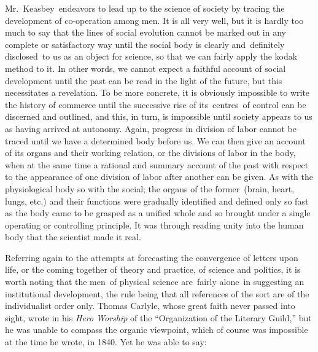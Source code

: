 \documentclass[openany,nobib]{tufte-book}
\begin{document}
Mr.~Keasbey~endeavors to lead up to the science of society by tracing
the development of co-operation among men. It is all very well, but it
is hardly too much to say that the lines of social evolution cannot be
marked out in any complete or satisfactory way until the social body is
clearly and~definitely disclosed~to us as an object for science, so that
we can fairly apply the kodak method to it. In other words, we cannot
expect a faithful account of social development until the past can be
read in the light of the future, but this necessitates a revelation. To
be more concrete, it is obviously impossible to write the history of
commerce until the successive rise of its~centres~of control can be
discerned and outlined, and this, in turn, is impossible until society
appears to us as having arrived at autonomy. Again, progress in division
of labor cannot be traced until we have a determined body before us. We
can then give an account of its organs and their working relation, or
the divisions of labor in the body, when at the same time a rational and
summary account of the past with respect to the appearance of one
division of labor after another can be given. As with the physiological
body so with the social; the organs of the former~(brain, heart, lungs,
etc.) and their functions were gradually identified and defined only so
fast as the body came to be grasped as a unified whole and so brought
under a single operating or controlling principle. It was through
reading unity into the human body that the scientist made it real.~

Referring again to the attempts at forecasting the convergence of
letters upon life, or the coming together of theory and practice, of
science and politics, it is worth noting that the men~of physical
science are~fairly alone~in suggesting an institutional development, the
rule being that all references of the sort are of the individualist
order only. Thomas Carlyle, whose great faith never passed into sight,
wrote in his \emph{Hero Worship} of the ``Organization of the Literary
Guild,'' but he was unable to compass the organic viewpoint, which of
course was impossible at the time he wrote, in 1840. Yet he was able to
say:~
\end{document}
